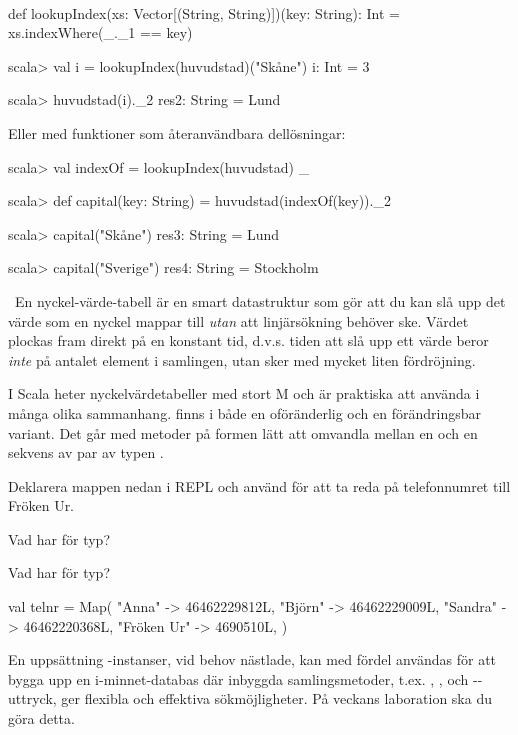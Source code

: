 \SOLUTION

\TaskSolved \what~

\SubtaskSolved
\begin{Code}
def lookupIndex(xs: Vector[(String, String)])(key: String): Int =
  xs.indexWhere(_._1 == key)
\end{Code}

\SubtaskSolved
\begin{REPL}
scala> val i = lookupIndex(huvudstad)("Skåne")
i: Int = 3

scala> huvudstad(i)._2
res2: String = Lund
\end{REPL}

\noindent Eller med funktioner som återanvändbara dellösningar:
\begin{REPL}
scala> val indexOf = lookupIndex(huvudstad) _

scala> def capital(key: String) = huvudstad(indexOf(key))._2

scala> capital("Skåne")
res3: String = Lund

scala> capital("Sverige")
res4: String = Stockholm
\end{REPL}

\QUESTEND




\QUESTBEGIN

\Task \what~En nyckel-värde-tabell är en smart datastruktur som gör att du kan slå upp det värde som en nyckel mappar till \emph{utan} att linjärsökning behöver ske. Värdet plockas fram direkt på en konstant tid, d.v.s. tiden att slå upp ett värde beror \emph{inte} på antalet element i samlingen, utan sker med mycket liten fördröjning.

I Scala heter nyckelvärdetabeller  med stort M och är praktiska att använda i många olika sammanhang.  finns i både en oföränderlig och en förändringsbar variant. Det går med metoder på formen  lätt att omvandla mellan en  och en sekvens av par av typen .

\Subtask Deklarera mappen  nedan i REPL och använd  för att ta reda på telefonnumret till Fröken Ur.

\Subtask Vad har  för typ?

\Subtask Vad har  för typ?

\begin{Code}
val telnr = Map(
  "Anna"     -> 46462229812L,
  "Björn"     -> 46462229009L,
  "Sandra"    -> 46462220368L,
  "Fröken Ur" -> 4690510L,
)
\end{Code}
En uppsättning -instanser, vid behov nästlade, kan med fördel användas för att bygga upp en i-minnet-databas där inbyggda samlingsmetoder, t.ex. , , och --uttryck, ger flexibla och effektiva sökmöjligheter. På veckans laboration ska du göra detta.

